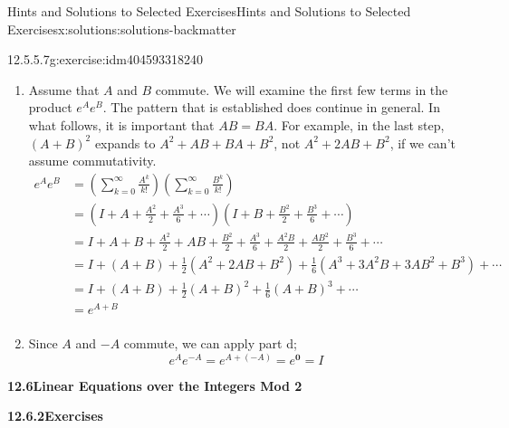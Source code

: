 \documentclass[twoside,10pt,]{book}
\newcommand{\blocktitlefont}{\relax}
\numberwithin{equation}{section}
\begin{document}
\begin{solutions-chapter}{Hints and Solutions to Selected Exercises}{}{Hints and Solutions to Selected Exercises}{}{}{x:solutions:solutions-backmatter}
\begin{divisionsolution}{12.5.5.7}{}{g:exercise:idm404593318240}
\begin{enumerate}[label=(\alph*)]
\item{}Assume that \(A\) and \(B\) commute. We will examine the first few terms in the product \(e^A e^B\). The pattern that is established does continue in general. In what follows, it is important that \(A B = B A\). For example, in the last step,   \((A+B)^2\) expands to \(A^2+A
B + B A + B^2\), not \(A^2+ 2 A B + B^2\),  if we can't assume commutativity.%
\begin{equation*}
\begin{split}
e^Ae^B &= \left(\sum _{k=0}^{\infty } \frac{A^k}{k!}\right) \left(\sum _{k=0}^{\infty } \frac{B^k}{k!}\right)\\
& =\left(I + A+\frac{A^2}{2}+ \frac{A^3}{6}+ \cdots \right)\left(I +B+\frac{B^2}{2}+ \frac{B^3}{6}+ \cdots \right)\\
&= I + A + B+ \frac{A^2}{2}+ A B + \frac{B^2}{2}+\frac{A^3}{6}+ \frac{A^2B}{2}+\frac{A B^2}{2}+ \frac{B^3}{6}+\cdots \\
&= I + (A+B) + \frac{1}{2}\left(A^2+ 2 A B + B^2\right)+ \frac{1}{6}\left(A^3+ 3A^2B+ 3A B^2+ B^3\right)+\cdots \\
&=I + (A+B)+ \frac{1}{2}(A+B)^2+ \frac{1}{6}(A+B)^3+\cdots \\
& =e^{A+B}\\
\end{split}
\end{equation*}
%
\item{}Since \(A\) and \(-A\) commute, we can apply part d;%
\begin{equation*}
e^Ae^{-A} = e^{A+(-A)} =e^{\pmb{0}} =I
\end{equation*}
%
\end{enumerate}
%
\end{divisionsolution}%
\par\smallskip
\noindent\textbf{\Large{}12.6\space\textperiodcentered\space{}Linear Equations over the Integers Mod 2}
\par\smallskip
\par\smallskip
\noindent\textbf{\Large{}12.6.2\space\textperiodcentered\space{}Exercises}
\par\smallskip
{}
\end{solutions-chapter}
\end{document}
